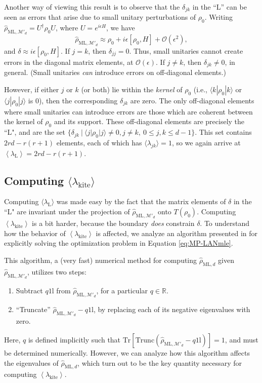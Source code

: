 \documentclass[aps,pra, twocolumn]{revtex4-1}
\newcommand{\M}{\mathcal{M}}
\newcommand{\Tr}{\mathrm{Tr}}
\newcommand{\Id}{\mathbb{I}}
\newcommand{\expect}[1]{\ensuremath{\left\langle#1\right\rangle}}
\def\Id{1\!\mathrm{l}}
\newcommand{\rhohat}{\hat{\rho}}
\newcommand{\rhoML}[1]{\rhohat_{\scriptscriptstyle{\mathrm{ML},#1}}}
\begin{document}
Another way of viewing this result is to observe that the $\delta_{jk}$ in the ``L'' can be seen as errors that arise due to small unitary perturbations of $\rho_{0}$. Writing $\rhoML{\M'_{d}} = U^{\dagger}\rho_{0}U$, where $U=e^{i\epsilon H}$, we have
\[\rhoML{\M'_{d}} \approx \rho_{0} + i\epsilon [\rho_{0},H]+\mathcal{O}(\epsilon^{2}),\]
and $\delta \approx i\epsilon [\rho_{0},H]$.
If $j = k$, then $\delta_{jj} = 0$. Thus, small unitaries cannot create errors in the diagonal matrix elements, at $\mathcal{O}(\epsilon)$. If $j \neq k$, then $\delta_{jk} \neq 0$, in general. (Small unitaries \emph{can} introduce errors on off-diagonal elements.)

However, if either $j$ or $k$ (or both) lie within the \emph{kernel} of $\rho_{0}$ (i.e., $\langle k | \rho_{0}| k \rangle$ or $\langle j|\rho_{0}|j\rangle$ is 0), then the corresponding $\delta_{jk}$ are zero. The only off-diagonal elements where small unitaries can introduce errors are those which are coherent between the kernel of $\rho_{0}$ and its support. These off-diagonal elements are precisely the ``L", and are  the set $\{\delta_{jk}~|~\langle j | \rho_{0}|j\rangle \neq 0, j\neq k, ~ 0 \leq j,k \leq d - 1\}$. This set contains $2rd - r(r+1)$ elements, each of which has $\langle \lambda_{jk}\rangle = 1$, so we again arrive at $\expect{\lambda_{\mathrm{L}}} = 2rd - r(r+1)$.

\subsection{Computing $\langle \lambda_\mathrm{kite}\rangle$}
\label{subsec:kite}
Computing $\langle \lambda_{\mathrm{L}}\rangle$ was made easy by the fact that the matrix elements of $\delta$ in the ``L" are invariant under the projection of $\rhoML{\M'_{d}}$ onto $T(\rho_{0})$. Computing $\expect{\lambda_{\mathrm{kite}}}$ is a bit harder, because the boundary \emph{does} constrain $\delta$. To understand how the behavior of $\expect{\lambda_{\mathrm{kite}}}$ is affected, we analyze an algorithm presented in \cite{Smolin2012} for explicitly solving the optimization problem in Equation \eqref{eq:MP-LANmle}.

This algorithm, a (very fast) numerical method for computing $\rhoML{d}$ given $\rhoML{\M'_{d}}$, utilizes two steps:
\begin{enumerate}[noitemsep]
\item Subtract $q\Id$ from $\rhoML{\M'_{d}}$, for a particular $q \in \mathbb{R}$.
\item ``Truncate'' $\rhoML{\M'_{d}}-q\Id$, by replacing each of its negative eigenvalues with zero.
\end{enumerate}
Here, $q$ is defined implicitly such that $\Tr\left[ \mathrm{Trunc}(\rhoML{\M'_{d}}-q\Id)\right] = 1$, and must be determined numerically.
However, we can analyze how this algorithm affects the eigenvalues of $\rhoML{d}$, which turn out to be the key quantity necessary for computing $\expect{\lambda_{\mathrm{kite}}}$.
\end{document}
